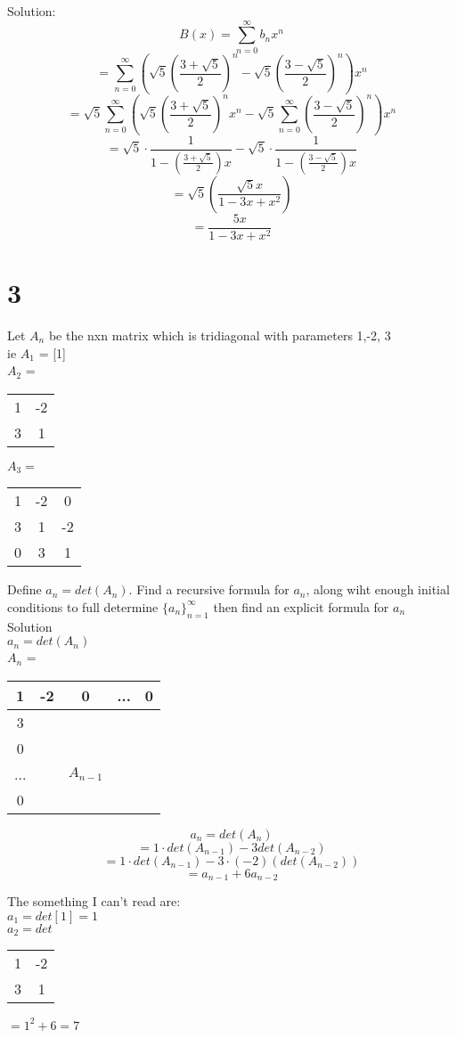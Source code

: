 \documentclass[12pt]{article}
\begin{document}
	Solution:\\
	$$B(x) = \sum_{n=0}^{\infty}b_nx^n$$
	$$= \sum_{n=0}^{\infty}(\sqrt{5}(\frac{3 + \sqrt{5}}{2})^n - \sqrt{5}(\frac{3-\sqrt{5}}{2})^n)x^n$$
	$$=\sqrt{5}\sum_{n=0}^{\infty}(\sqrt{5}(\frac{3 + \sqrt{5}}{2})^nx^n - \sqrt{5}\sum_{n=0}^{\infty}(\frac{3-\sqrt{5}}{2})^n)x^n$$
	$$=\sqrt{5} \cdot \frac{1}{1-(\frac{3+\sqrt{5}}{2})x} - \sqrt{5} \cdot \frac{1}{1-(\frac{3-\sqrt{5}}{2})x}$$
	$$= \sqrt{5}(\frac{\sqrt{5}x}{1-3x+x^2})$$
	$$= \frac{5x}{1-3x+x^2}$$
	
	\section*{3}
	Let $A_n$ be the nxn matrix which is tridiagonal with parameters 1,-2, 3\\
	ie $A_1$ = [1]\\
	$A_2$ =
	\begin{tabular}{|c c|}
		1 & -2 \\
		3 & 1\\
	\end{tabular}
	$A_3 = $
	\begin{tabular}{| c c c |}
		1 & -2 & 0\\
		3 & 1 & -2 \\
		0 & 3 & 1 \\
	\end{tabular}
	Define $a_n = det(A_n)$. Find a recursive formula for $a_n$, along wiht enough initial conditions to full determine $\{a_n\}^{\infty}_{n=1}$ then find an explicit formula for $a_n$\\
	
	Solution\\
	$a_n = det(A_n)$\\
	
	$A_n$ = 
	\begin{tabular}{| c | c c c c|}
		1 & -2 & 0 & ... & 0 \\ \hline
		3 & & & & \\
		0 & & & & \\
		... & & $A_{n-1}$ & & \\
		0 & & & & \\
	\end{tabular}
	
	$$a_n = det(A_n)$$
	$$= 1 \cdot det(A_{n-1}) - 3 det(A_{n-2})$$
	$$ = 1 \cdot det(A_{n-1}) - 3 \cdot(-2)(det(A_{n-2}))$$
	$$= a_{n-1} + 6a_{n-2}$$
	
	The something I can't read are:\\
	$a_1 = det[1] = 1$\\
	$a_2 = det$
	\begin{tabular}{|c c|}
		1 & -2 \\
		3 & 1 \\
	\end{tabular}
	$= 1^2 + 6 = 7$\\
	
\end{document}
